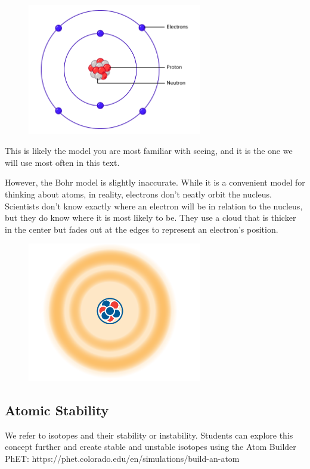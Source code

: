 \begin{figure}
\noindent\includegraphics[width=3in]{bohr_model.png}
\end{figure}

This is likely the model you are most familiar with seeing, and it is the one we
will use most often in this text. 

However, the Bohr model is slightly inaccurate. While it is a convenient model for
thinking about atoms, in reality, electrons don't neatly orbit the nucleus.
Scientists don't know exactly where an electron will be in relation to the
nucleus, but they do know where it is most likely to be. They use a cloud that is
thicker in the center but fades out at the edges to represent an electron's
position.

\begin{figure}
\noindent\includegraphics[trim={0 5cm 0 0}, width=3in]{atomCloud.png}
\end{figure}

\subsection{Atomic Stability}
We refer to isotopes and their stability or instability. Students can explore this concept further and create stable and unstable isotopes using the Atom Builder PhET: https://phet.colorado.edu/en/simulations/build-an-atom

